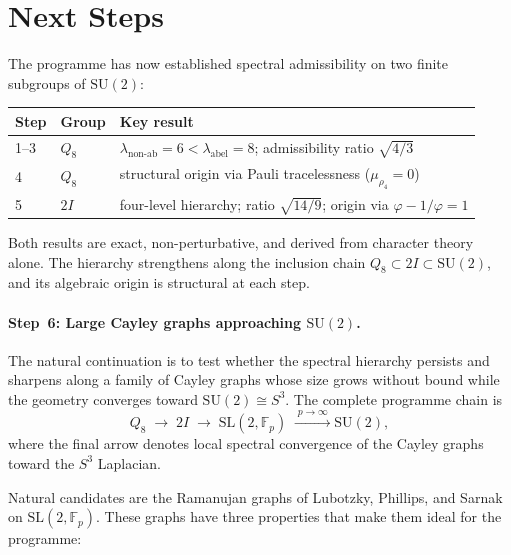 \section{Next Steps}
  \label{sec:next}

  The programme has now established spectral admissibility on two finite
  subgroups of $\mathrm{SU}(2)$:
  \begin{center}
    \renewcommand{\arraystretch}{1.2}
    \begin{tabular}{lll}
      \hline
      Step & Group & Key result \\
      \hline
      1--3 & $Q_8$ & $\lambda_{\text{non-ab}} = 6 < \lambda_{\text{abel}} = 8$;
      admissibility ratio $\sqrt{4/3}$ \\
      4 & $Q_8$ & structural origin via Pauli tracelessness
      ($\mu_{\rho_4} = 0$) \\
      5 & $2I$ & four-level hierarchy; ratio $\sqrt{14/9}$;
      origin via $\varphi - 1/\varphi = 1$ \\
      \hline
    \end{tabular}
  \end{center}

  Both results are exact, non-perturbative, and derived from character
  theory alone.
  The hierarchy strengthens along the inclusion chain
  $Q_8 \subset 2I \subset \mathrm{SU}(2)$, and its algebraic origin is
  structural at each step.

  \paragraph{Step~6: Large Cayley graphs approaching $\mathrm{SU}(2)$.}

    The natural continuation is to test whether the spectral hierarchy
    persists and sharpens along a family of Cayley graphs whose size grows
    without bound while the geometry converges toward
    $\mathrm{SU}(2) \cong S^3$.
    The complete programme chain is
    \begin{equation}
      Q_8
      \;\longrightarrow\;
      2I
      \;\longrightarrow\;
      \mathrm{SL}(2,\mathbb{F}_p)
      \;\xrightarrow{\;p \to \infty\;}
      \mathrm{SU}(2),
      \label{eq:chain-full}
    \end{equation}
    where the final arrow denotes local spectral convergence of the Cayley
    graphs toward the $S^3$ Laplacian.

    Natural candidates are the Ramanujan graphs of Lubotzky, Phillips, and
    Sarnak~\cite{LPS1988} on $\mathrm{SL}(2,\mathbb{F}_p)$.
    These graphs have three properties that make them ideal for the
    programme:


